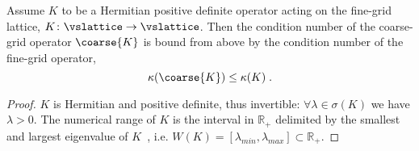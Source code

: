 \begin{theorem} \label{thm:cond:hpd}
Assume $K$ to be a Hermitian positive definite operator acting on the fine-grid lattice, $K \colon \vslattice \rightarrow \vslattice$. Then the condition number of the coarse-grid operator $\coarse{K}$ is bound from above by the condition number of the fine-grid operator,
\begin{equation}
\kappa(\coarse{K}) \leq \kappa(K) \;.
\end{equation}
\end{theorem}

\begin{proof}
$K$ is Hermitian and positive definite, thus invertible: $\forall \lambda \in \sigma(K)$ we have $\lambda > 0$.
The numerical range of $K$ is the interval in $\mathbb{R}_+$ delimited by the smallest and largest eigenvalue of $K$~\cite{gustafson1997numerical}, i.e. $W(K) = [ \lambda_{min}, \lambda_{max} ] \subset \mathbb{R}_+$.

\end{proof}
